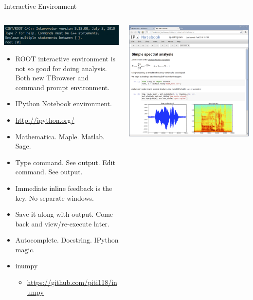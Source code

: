 \documentclass{beamer}
\begin{document}
\begin{frame}[fragile, shrink=5]{Interactive Environment}
	\fontsize{10}{10}\selectfont
	\begin{columns}
	\begin{column}{0.5\textwidth}
		\includegraphics[width=\textwidth]{pic/cint.png}
		\begin{itemize}
		\item ROOT interactive environment is not so good for doing analysis. Both new TBrowser and command prompt environment.
		\item IPython Notebook environment. 
		\item \url{http://ipython.org/}
		\item Mathematica. Maple. Matlab. Sage.
		\item Type command. See output. Edit command. See output.
		\item Immediate inline feedback is the key. No separate windows.
		\item Save it along with output. Come back and view/re-execute later.
		\item Autocomplete. Docstring. IPython magic.
		\item inumpy
			\begin{itemize}
				\item \tiny \url{https://github.com/piti118/inumpy}
			\end{itemize}
		\end{itemize}
	\end{column}
	\begin{column}{0.5\textwidth}
		\includegraphics[width=\textwidth]{pic/ipy-notebook-spectral.png}\\

\end{column}
\end{columns}
\end{frame}
\end{document}
